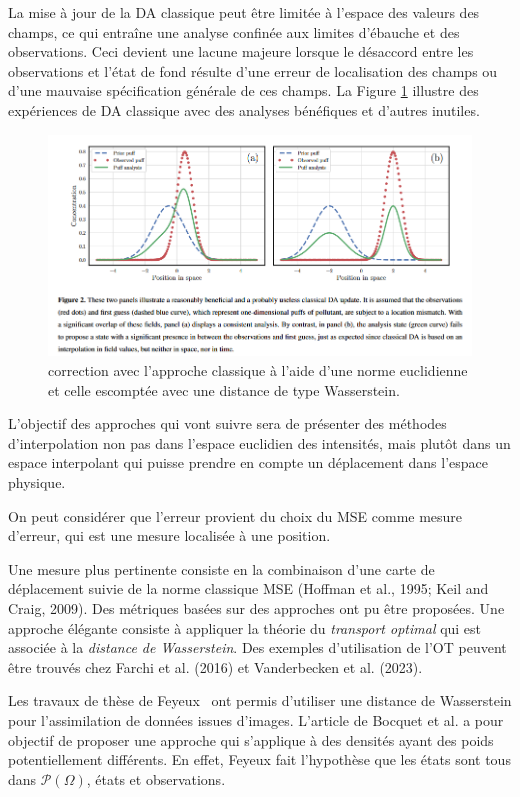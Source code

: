 \documentclass{article}
\begin{document}
La mise à jour de la DA classique peut être limitée à l'espace des valeurs des champs, ce qui entraîne une analyse confinée aux limites d'ébauche et des observations. Ceci devient une lacune majeure lorsque le désaccord entre les observations et l'état de fond résulte d'une erreur de localisation des champs ou d'une mauvaise spécification générale de ces champs. La Figure \ref{fig:prior_field} illustre des expériences de DA classique avec des analyses bénéfiques et d'autres inutiles.

\begin{figure}[h]
    \centering
    \includegraphics[width=\linewidth]{prior_field.png}
    \caption{correction avec l'approche classique à l'aide d'une norme euclidienne et celle escomptée avec une distance de type Wasserstein.}
    \label{fig:prior_field}
\end{figure}

L'objectif des approches qui vont suivre sera de présenter des méthodes d'interpolation non pas dans l'espace euclidien des intensités, mais plutôt dans un espace interpolant qui puisse prendre en compte un déplacement dans l'espace physique.

On peut considérer que l'erreur provient du choix du MSE comme mesure d'erreur, qui est une mesure localisée à une position.


Une mesure plus pertinente consiste en la combinaison d'une carte de déplacement suivie de la norme classique MSE (Hoffman et al., 1995; Keil and Craig, 2009). Des métriques basées sur des approches ont pu être proposées.
Une approche élégante consiste à appliquer la théorie du \textit{transport optimal} qui est associée à la \textit{distance de Wasserstein}. Des exemples d'utilisation de l'OT peuvent être trouvés chez Farchi et al. (2016) et Vanderbecken et al. (2023).

Les travaux de thèse de Feyeux~\cite{feyeux_transport_nodate} ont permis d'utiliser une distance de Wasserstein pour l'assimilation de données issues d'images. L'article de Bocquet et al. \cite{bocquet_bridging_2023} a pour objectif de proposer une approche qui s'applique à des densités ayant des poids potentiellement différents. En effet, Feyeux fait l'hypothèse que les états sont tous dans $\mathcal P(\Omega)$, états et observations.
\end{document}
